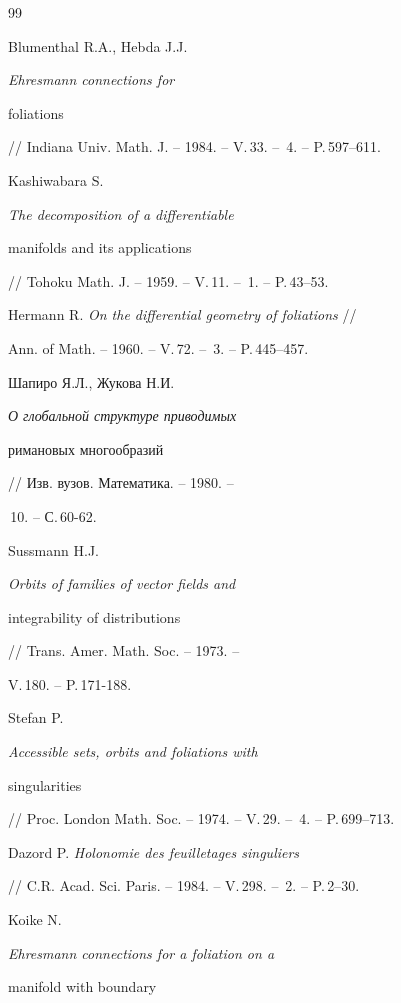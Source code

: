 \begin{thebibliography}{99}







Blumenthal R.A., Hebda J.J. {\it Ehresmann connections for 


foliations}


 // Indiana Univ. Math. J. -- 1984. -- V.\,33. -- \No\,4. -- P.\,597--611.




Kashiwabara S. {\it The decomposition of a differentiable


manifolds and its applications}


// Tohoku Math. J. -- 1959. -- V.\,11. -- \No\,1. -- P.\,43--53.




Hermann  R. {\it On the differential geometry of foliations} //


Ann. of Math. -- 1960. -- V.\,72. -- \No\,3. -- P.\,445--457.




Шапиро Я.Л., Жукова Н.И. {\it О глобальной структуре приводимых


римановых многообразий} // Изв. вузов. Математика. -- 1980. --


\No\,10. -- С.\,60-62.




Sussmann H.J. {\it Orbits of families of vector fields and


integrability of distributions} // Trans. Amer. Math. Soc. -- 1973. -- 


V.\,180. -- P.\,171-188.




Stefan P. {\it Accessible sets, orbits and foliations with 


singularities}


 // Proc. London Math. Soc. -- 1974. -- V.\,29. -- \No\,4. -- P.\,699--713.




Dazord P. {\it Holonomie des feuilletages singuliers}


// C.\;R. Acad. Sci. Paris. -- 1984. -- V.\,298. -- \No\,2. -- P.\,2--30.




Koike N. {\it Ehresmann connections for a foliation on a 


manifold with boundary}



\end{thebibliography}
